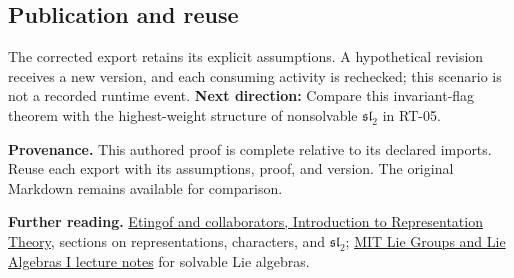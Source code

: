 \documentclass[preprint,12pt,aps,pra,showkeys,amsmath,amssymb,superscriptaddress,floatfix]{revtex4-2}
\theoremstyle{definition}
\theoremstyle{remark}
\begin{document}
\subsection{Publication and reuse}
The corrected export retains its explicit assumptions. A hypothetical
revision receives a new version, and each consuming activity is
rechecked; this scenario is not a recorded runtime event. \textbf{Next
direction:} Compare this invariant-flag theorem with the highest-weight
structure of nonsolvable \(\mathfrak{sl}_2\) in RT-05.

\par\medskip\begingroup\small\linespread{1.0}\selectfont\noindent\textbf{Provenance.} This authored proof is complete relative to its declared imports. Reuse
each export with its assumptions, proof, and version. The original
Markdown remains available for comparison.
\par\endgroup

\par\smallskip\begingroup\small\linespread{1.0}\selectfont\noindent\textbf{Further reading.} \href{https://math.mit.edu/~etingof/reprbook.pdf}{Etingof and
collaborators, Introduction to Representation Theory}, sections on
representations, characters, and \(\mathfrak{sl}_2\);
\href{https://ocw.mit.edu/courses/18-745-lie-groups-and-lie-algebras-i-fall-2020/lists/lecture-notes/}{MIT
Lie Groups and Lie Algebras I lecture notes} for solvable Lie algebras.\par\endgroup
\end{document}
